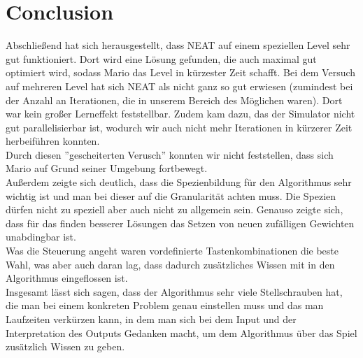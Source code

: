 \documentclass{hbrs-ecta-report}
\begin{document}
\FloatBarrier
\newpage
\section{Conclusion}
Abschließend hat sich herausgestellt, dass NEAT auf einem speziellen Level sehr gut funktioniert. Dort wird eine Lösung gefunden, die auch maximal gut optimiert wird, sodass Mario das Level in kürzester Zeit schafft. Bei dem Versuch auf mehreren Level hat sich NEAT als nicht ganz so gut erwiesen (zumindest bei der Anzahl an Iterationen, die in unserem Bereich des Möglichen waren). Dort war kein großer Lerneffekt feststellbar. Zudem kam dazu, das der Simulator nicht gut parallelisierbar ist, wodurch wir auch nicht mehr Iterationen in kürzerer Zeit herbeiführen konnten. \\
Durch diesen ''gescheiterten Verusch'' konnten wir nicht feststellen, dass sich Mario auf Grund seiner Umgebung fortbewegt.\\

Außerdem zeigte sich deutlich, dass die Spezienbildung für den Algorithmus sehr wichtig ist und man bei dieser auf die Granularität achten muss. Die Spezien dürfen nicht zu speziell aber auch nicht zu allgemein sein.
Genauso zeigte sich, dass für das finden besserer Lösungen das Setzen von neuen zufälligen Gewichten unabdingbar ist.\\

Was die Steuerung angeht waren vordefinierte Tastenkombinationen die beste Wahl, was aber auch daran lag, dass dadurch zusätzliches Wissen mit in den Algorithmus eingeflossen ist.\\

Insgesamt lässt sich sagen, dass der Algorithmus sehr viele Stellschrauben hat, die man bei einem konkreten Problem genau einstellen muss und das man Laufzeiten verkürzen kann, in dem man sich bei dem Input und der Interpretation des Outputs Gedanken macht, um dem Algorithmus über das Spiel zusätzlich Wissen zu geben.


 
\end{document}
